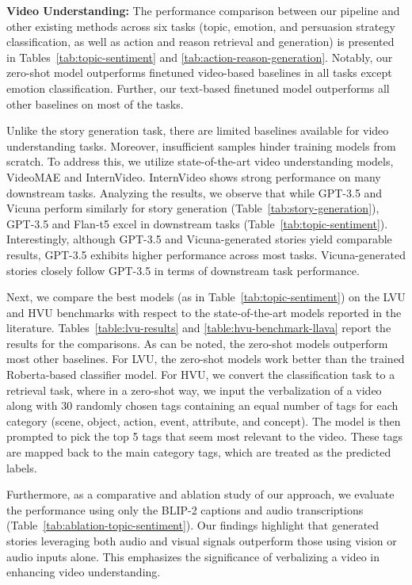 \textbf{Video Understanding:} The performance comparison between our pipeline and other existing methods across six tasks (topic, emotion, and persuasion strategy classification, as well as action and reason retrieval and generation) is presented in Tables~\ref{tab:topic-sentiment} and \ref{tab:action-reason-generation}. Notably, our zero-shot model outperforms finetuned video-based baselines in all tasks except emotion classification. Further, our text-based finetuned model outperforms all other baselines on most of the tasks.

Unlike the story generation task, there are limited baselines available for video understanding tasks. Moreover, insufficient samples hinder training models from scratch. To address this, we utilize state-of-the-art video understanding models, VideoMAE and InternVideo. InternVideo shows strong performance on many downstream tasks. 
Analyzing the results, we observe that while GPT-3.5 and Vicuna perform similarly for story generation (Table~\ref{tab:story-generation}), GPT-3.5 and Flan-t5 excel in downstream tasks (Table~\ref{tab:topic-sentiment}). Interestingly, although GPT-3.5 and Vicuna-generated stories yield comparable results, GPT-3.5 exhibits higher performance across most tasks. Vicuna-generated stories closely follow GPT-3.5 in terms of downstream task performance.


Next, we compare the best models (as in Table~\ref{tab:topic-sentiment}) on the LVU and HVU benchmarks with respect to the state-of-the-art models reported in the literature. Tables~\ref{table:lvu-results} and \ref{table:hvu-benchmark-llava} report the results for the comparisons. As can be noted, the zero-shot models outperform most other baselines. For LVU, the zero-shot models work better than the trained Roberta-based classifier model. For HVU, we convert the classification task to a retrieval task, where in a zero-shot way, we input the verbalization of a video along with 30 randomly chosen tags containing an equal number of tags for each category (scene, object, action, event, attribute, and concept). The model is then prompted to pick the top 5 tags that seem most relevant to the video. These tags are mapped back to the main category tags, which are treated as the predicted labels. 


Furthermore, as a comparative and ablation study of our approach, we evaluate the performance using only the BLIP-2 captions and audio transcriptions (Table~\ref{tab:ablation-topic-sentiment}). Our findings highlight that generated stories leveraging both audio and visual signals outperform those using vision or audio inputs alone. This emphasizes the significance of verbalizing a video in enhancing video understanding.



